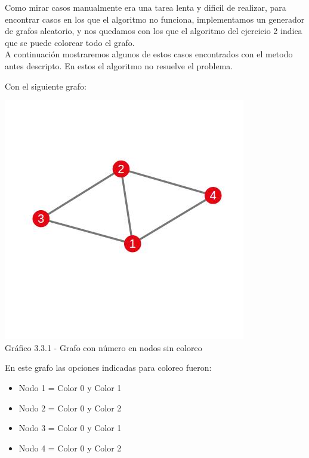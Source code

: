 Como mirar casos manualmente era una tarea lenta y dificil de realizar, para encontrar casos en los que el algoritmo no funciona, implementamos un generador de grafos aleatorio, y nos quedamos con los que el algoritmo del ejercicio 2 indica que se puede colorear todo el grafo.\\

A continuación mostraremos algunos de estos casos encontrados con el metodo antes descripto. En estos el algoritmo no resuelve el problema.

Con el siguiente grafo:

\vspace*{0.3cm} \vspace*{0.3cm}
  \begin{center}
 \includegraphics[scale=0.5]{./ej3/parte3/grafo1.jpg}
 	{\\Gráfico 3.3.1 - Grafo con número en nodos sin coloreo}
  \end{center}
  \vspace*{0.3cm}
  
En este grafo las opciones indicadas para coloreo fueron:\\
\begin{itemize}
\item Nodo 1 = Color 0 y Color 1
\item Nodo 2 = Color 0 y Color 2
\item Nodo 3 = Color 0 y Color 1
\item Nodo 4 = Color 0 y Color 2
\end{itemize}

